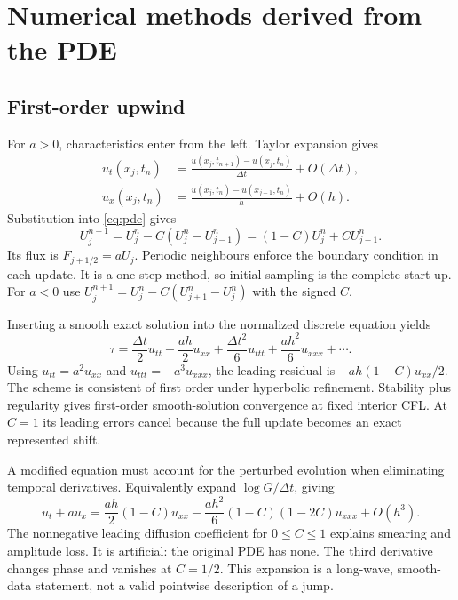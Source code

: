 \section{Numerical methods derived from the PDE}
\subsection{First-order upwind}
For $a>0$, characteristics enter from the left. Taylor expansion gives
\begin{align*}
 u_t(x_j,t_n)&=\frac{u(x_j,t_{n+1})-u(x_j,t_n)}{\Delta t}+O(\Delta t),\\
 u_x(x_j,t_n)&=\frac{u(x_j,t_n)-u(x_{j-1},t_n)}h+O(h).
\end{align*}
Substitution into \eqref{eq:pde} gives
\begin{equation}\label{eq:up}
 U_j^{n+1}=U_j^n-C(U_j^n-U_{j-1}^n)=(1-C)U_j^n+C U_{j-1}^n.
\end{equation}
Its flux is $F_{j+1/2}=aU_j$. Periodic neighbours enforce the boundary condition in each update. It is a one-step method, so initial sampling is the complete start-up. For $a<0$ use $U_j^{n+1}=U_j^n-C(U_{j+1}^n-U_j^n)$ with the signed $C$.

Inserting a smooth exact solution into the normalized discrete equation yields
\begin{equation}
 \tau=\frac{\Delta t}{2}u_{tt}-\frac{ah}{2}u_{xx}
       +\frac{\Delta t^2}{6}u_{ttt}+\frac{ah^2}{6}u_{xxx}+\cdots.
\end{equation}
Using $u_{tt}=a^2u_{xx}$ and $u_{ttt}=-a^3u_{xxx}$, the leading residual is $-ah(1-C)u_{xx}/2$. The scheme is consistent of first order under hyperbolic refinement. Stability plus regularity gives first-order smooth-solution convergence at fixed interior CFL. At $C=1$ its leading errors cancel because the full update becomes an exact represented shift.

A modified equation must account for the perturbed evolution when eliminating temporal derivatives. Equivalently expand $\log G/\Delta t$, giving
\begin{equation}\label{eq:modup}
 u_t+a u_x=\frac{ah}{2}(1-C)u_{xx}
 -\frac{ah^2}{6}(1-C)(1-2C)u_{xxx}+O(h^3).
\end{equation}
The nonnegative leading diffusion coefficient for $0\le C\le1$ explains smearing and amplitude loss. It is artificial: the original PDE has none. The third derivative changes phase and vanishes at $C=1/2$. This expansion is a long-wave, smooth-data statement, not a valid pointwise description of a jump.

